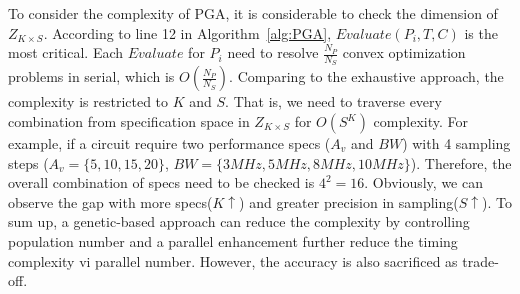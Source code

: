    To consider the complexity of PGA, it is considerable to check the dimension of $Z_{K\times S}$. According to line 12 in Algorithm~\ref{alg:PGA}, $Evaluate(P_i,T,C)$ is the most critical. Each $Evaluate$ for $P_i$ need to resolve $\frac{N_P}{N_S}$ convex optimization problems in serial, which is $O(\frac{N_P}{N_S})$. Comparing to the exhaustive approach, the complexity is restricted to $K$ and $S$. That is, we need to traverse every combination from specification space in $Z_{K\times S}$ for $O(S^K)$ complexity. For example, if a circuit require two performance specs ($A_v$ and $BW$) with 4 sampling steps ($A_v = \{5,10,15,20\}$, $BW = \{3MHz,5MHz,8MHz,10MHz\}$). Therefore, the overall combination of specs need to be checked is $4^2=16$. Obviously, we can observe the gap with more specs($K\uparrow$) and greater precision in sampling($S\uparrow$). To sum up, a genetic-based approach can reduce the complexity by controlling population number and a parallel enhancement further reduce the timing complexity vi parallel number. However, the accuracy is also sacrificed as trade-off.



